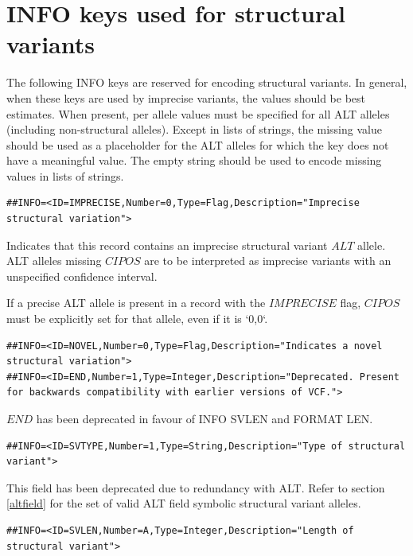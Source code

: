 \documentclass[8pt]{article}
\begin{document}
\section{INFO keys used for structural variants}
\label{sv-info-keys}
\begin{samepage}
The following INFO keys are reserved for encoding structural variants.
In general, when these keys are used by imprecise variants, the values should be best estimates.
When present, per allele values must be specified for all ALT alleles (including non-structural alleles).
Except in lists of strings, the missing value should be used as a placeholder for the ALT alleles for which the key does not have a meaningful value.
The empty string should be used to encode missing values in lists of strings.

\footnotesize
\begin{verbatim}
##INFO=<ID=IMPRECISE,Number=0,Type=Flag,Description="Imprecise structural variation">
\end{verbatim}
\normalsize

Indicates that this record contains an imprecise structural variant $ALT$ allele. ALT alleles missing $CIPOS$ are to be interpreted as imprecise variants with an unspecified confidence interval.

If a precise ALT allele is present in a record with the $IMPRECISE$ flag, $CIPOS$ must be explicitly set for that allele, even if it is `0,0`.

\footnotesize
\begin{verbatim}
##INFO=<ID=NOVEL,Number=0,Type=Flag,Description="Indicates a novel structural variation">
##INFO=<ID=END,Number=1,Type=Integer,Description="Deprecated. Present for backwards compatibility with earlier versions of VCF.">
\end{verbatim}
\normalsize

$END$ has been deprecated in favour of INFO SVLEN and FORMAT LEN.
  
\footnotesize
\begin{verbatim}
##INFO=<ID=SVTYPE,Number=1,Type=String,Description="Type of structural variant">
\end{verbatim}
\normalsize
\end{samepage}

This field has been deprecated due to redundancy with ALT.
Refer to section \ref{altfield} for the set of valid ALT field symbolic structural variant alleles.

\footnotesize
\begin{verbatim}
##INFO=<ID=SVLEN,Number=A,Type=Integer,Description="Length of structural variant">
\end{verbatim}
\normalsize
\end{document}
